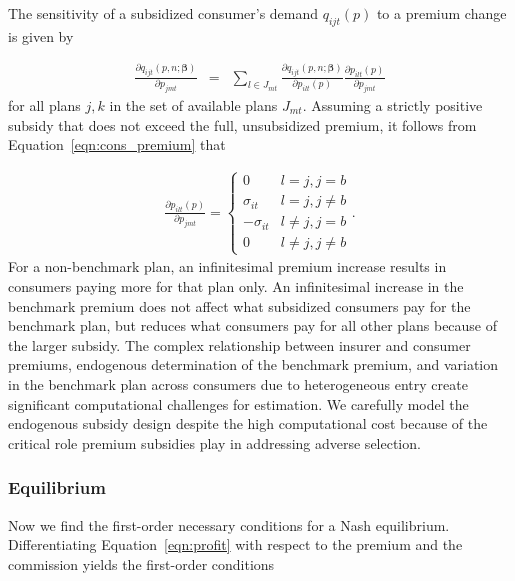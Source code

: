 \documentclass[12pt]{article}
\begin{document}
The sensitivity of a subsidized consumer's demand $q_{ijt}(\textit{p})$ to a premium change is given by  

\vspace{-0.4in}
\begin{eqnarray*}
	\frac{\partial q_{ijt}(\textit{p},\textit{n};\boldsymbol{\beta})}{\partial p_{jmt}} &=& \sum_{l \in J_{mt}} \frac{ \partial q_{ijt}(\textit{p},\textit{n};\boldsymbol{\beta})}{\partial p_{ilt}(\textit{p})}\frac{ \partial p_{ilt}(\textit{p})}{\partial p_{jmt}}
\end{eqnarray*}
\noindent for all plans $j,k$ in the set of available plans $J_{mt}$.  Assuming a strictly positive subsidy that does not exceed the full, unsubsidized premium, it follows from Equation~\eqref{eqn:cons_premium} that

\vspace{-0.4in}
\singlespacing
\begin{eqnarray}
\label{eqn:price_partial_formula}
    \frac{\partial p_{ilt}(\textit{p})}{\partial p_{jmt}} = 
    \begin{cases} 
	    0 & l=j, j = b \\		
		\sigma_{it} & l = j, j \neq b \\     
		-\sigma_{it} & l \neq j, j = b \\
		0 & l \neq j, j \neq b  
    \end{cases}.
\end{eqnarray}
\doublespacing
For a non-benchmark plan, an infinitesimal premium increase results in consumers paying more for that plan only.  An infinitesimal increase in the benchmark premium does not affect what subsidized consumers pay for the benchmark plan, but reduces what consumers pay for all other plans because of the larger subsidy. The complex relationship between insurer and consumer premiums, endogenous determination of the benchmark premium, and variation in the benchmark plan across consumers due to heterogeneous entry create significant computational challenges for estimation.  We carefully model the endogenous subsidy design despite the high computational cost because of the critical role premium subsidies play in addressing adverse selection.  

\subsubsection*{Equilibrium}

Now we find the first-order necessary conditions for a Nash equilibrium.  Differentiating Equation~\eqref{eqn:profit} with respect to the premium and the commission yields the  first-order conditions  
\end{document}
